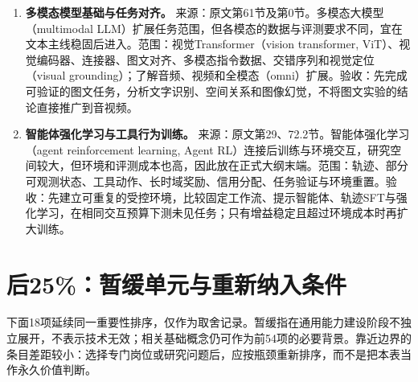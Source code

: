 \documentclass[UTF8,12pt,a4paper,fontset=fandol]{ctexart}
\begin{document}
\begin{enumerate}[resume=techrank]
\item \textbf{多模态模型基础与任务对齐。}\label{tech:multimodal}
来源：原文第61节及第0节。多模态大模型（multimodal LLM）扩展任务范围，但各模态的数据与评测要求不同，宜在文本主线稳固后进入。范围：视觉Transformer（vision transformer, ViT）、视觉编码器、连接器、图文对齐、多模态指令数据、交错序列和视觉定位（visual grounding）；了解音频、视频和全模态（omni）扩展。验收：先完成可验证的图文任务，分析文字识别、空间关系和图像幻觉，不将图文实验的结论直接推广到音视频。

\item \textbf{智能体强化学习与工具行为训练。}\label{tech:agentrl}
来源：原文第29、72.2节。智能体强化学习（agent reinforcement learning, Agent RL）连接后训练与环境交互，研究空间较大，但环境和评测成本也高，因此放在正式大纲末端。范围：轨迹、部分可观测状态、工具动作、长时域奖励、信用分配、任务验证与环境重置。验收：先建立可重复的受控环境，比较固定工作流、提示智能体、轨迹SFT与强化学习，在相同交互预算下测未见任务；只有增益稳定且超过环境成本时再扩大训练。
\end{enumerate}

\section{后25\%：暂缓单元与重新纳入条件}
\label{sec:deferred}

下面18项延续同一重要性排序，仅作为取舍记录。暂缓指在通用能力建设阶段不独立展开，不表示技术无效；相关基础概念仍可作为前54项的必要背景。靠近边界的条目差距较小：选择专门岗位或研究问题后，应按瓶颈重新排序，而不是把本表当作永久价值判断。
\end{document}
